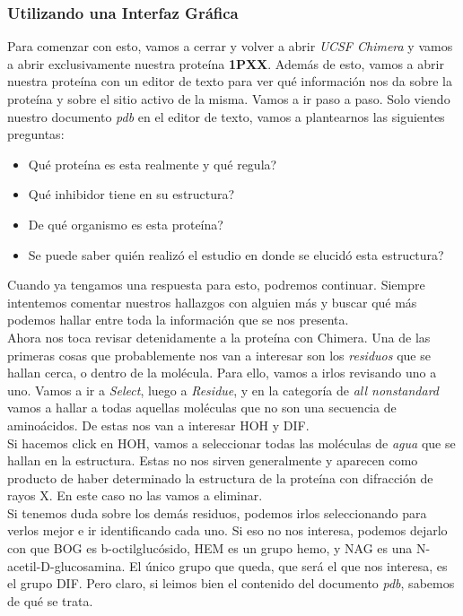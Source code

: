 \documentclass[10pt,letterpaper]{article}
\begin{document}
\subsubsection{Utilizando una Interfaz Gr\'afica}

Para comenzar con esto, vamos a cerrar y volver a abrir \textit{UCSF Chimera} y vamos a abrir exclusivamente nuestra prote\'ina \textbf{1PXX}. Adem\'as de esto, vamos a abrir nuestra prote\'ina con un editor de texto para ver qu\'e informaci\'on nos da sobre la prote\'ina y sobre el sitio activo de la misma. Vamos a ir paso a paso. Solo viendo nuestro documento \emph{pdb} en el editor de texto, vamos a plantearnos las siguientes preguntas:

\begin{itemize}
\item Qu\'e prote\'ina es esta realmente y qu\'e regula?
\item Qu\'e inhibidor tiene en su estructura?
\item De qu\'e organismo es esta prote\'ina?
\item Se puede saber qui\'en realiz\'o el estudio en donde se elucid\'o esta estructura?
\end{itemize}

Cuando ya tengamos una respuesta para esto, podremos continuar. Siempre intentemos comentar nuestros hallazgos con alguien m\'as y buscar qu\'e m\'as podemos hallar entre toda la informaci\'on que se nos presenta.\\

Ahora nos toca revisar detenidamente a la prote\'ina con Chimera. Una de las primeras cosas que probablemente nos van a interesar son los \emph{residuos} que se hallan cerca, o dentro de la mol\'ecula. Para ello, vamos a irlos revisando uno a uno. Vamos a ir a \emph{Select}, luego a \emph{Residue}, y en la categor\'ia de \emph{all nonstandard} vamos a hallar a todas aquellas mol\'eculas que no son una secuencia de amino\'acidos. De estas nos van a interesar HOH y DIF.\\

Si hacemos click en HOH, vamos a seleccionar todas las mol\'eculas de \emph{agua} que se hallan en la estructura. Estas no nos sirven generalmente y aparecen como producto de haber determinado la estructura de la prote\'ina con difracci\'on de rayos X. En este caso no las vamos a eliminar.\\

Si tenemos duda sobre los dem\'as residuos, podemos irlos seleccionando para verlos mejor e ir identificando cada uno. Si eso no nos interesa, podemos dejarlo con que BOG es b-octilgluc\'osido, HEM es un grupo hemo, y NAG es una N-acetil-D-glucosamina. El \'unico grupo que queda, que ser\'a el que nos interesa, es el grupo DIF. Pero claro, si leimos bien el contenido del documento \emph{pdb}, sabemos de qu\'e se trata.\\
\end{document}

